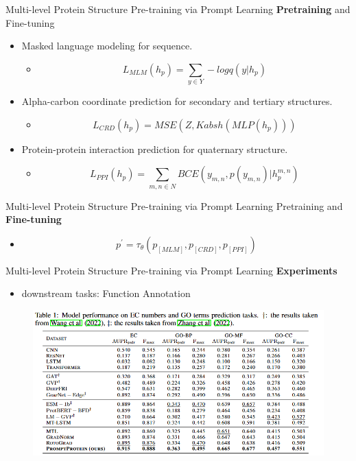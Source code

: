 \documentclass[notheorems, aspectratio=54]{beamer}
\begin{document}
\begin{frame}{Multi-level Protein Structure Pre-training via Prompt Learning}
  \textbf{Pretraining} and Fine-tuning
    
    \begin{itemize}
      \item Masked language modeling for sequence.
      \begin{itemize}
        \item $$L_{MLM}(h_p) = \sum_{y \in Y} -logq(y|h_p)$$
      \end{itemize}
      \item Alpha-carbon coordinate prediction for secondary and tertiary structures.
      \begin{itemize}
        \item $$L_{CRD}(h_p) = MSE(Z, Kabsh(MLP(h_p)))$$
      \end{itemize}
      \item Protein-protein interaction prediction for quaternary structure. 
      \begin{itemize}
        \item $$L_{PPI}(h_p) = \sum_{m,n \in N} BCE(y_{m,n}, p(y_{m,n})|h_p^{m,n})$$
      \end{itemize}
    \end{itemize}
\end{frame}


\begin{frame}{Multi-level Protein Structure Pre-training via Prompt Learning}
  Pretraining and \textbf{Fine-tuning}
  
  \begin{itemize}
  \item $$p^{\prime} = \tau_\theta(p_{[MLM]}, p_{[CRD]}, p_{[PPI]})$$
  \end{itemize}
\end{frame}


\begin{frame}{Multi-level Protein Structure Pre-training via Prompt Learning}
  \textbf{Experiments}

  \begin{itemize}
  \item downstream tasks: Function Annotation
  \end{itemize}

  \begin{figure}[!h]
    \centering
    \includegraphics[width=0.9\linewidth]{figures/MPH-tab1.png}
  \end{figure}

\end{frame}
\end{document}
